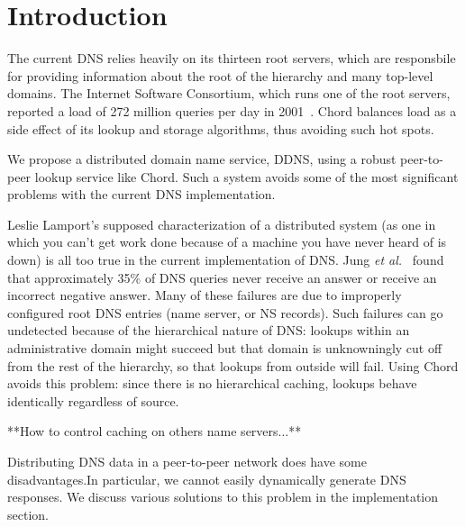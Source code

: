 \section{Introduction}

The current DNS relies heavily on its
thirteen root servers, which are responsbile for providing
information about the root of the hierarchy and many top-level domains.
The Internet Software Consortium, which runs one of the root servers,
reported a load of 272 million queries per day in 2001~\cite{isc-root}.
Chord balances load as a side effect of its lookup and storage 
algorithms, thus avoiding such hot spots.

We propose a distributed domain name service, DDNS,
using a robust peer-to-peer lookup service like Chord.
Such a system avoids some of the most significant
problems with the current DNS implementation.
 
Leslie Lamport's supposed characterization of a
distributed system (as one in which you can't get work
done because of a machine you have never heard of is down)
is all too true in the current implementation of {DNS}.
Jung {\it et al.}~\cite{dnscache:sigcommimw01} found that approximately
35\% of DNS queries never receive an answer or receive
an incorrect negative answer.
Many of these failures are due to improperly configured
root DNS entries (name server, or NS records).
Such failures can go undetected because of the hierarchical
nature of DNS: lookups within an administrative domain might
succeed but that domain is unknowningly cut off from the rest
of the hierarchy, so that lookups from outside will fail.
Using Chord avoids this problem: since there is no hierarchical
caching, lookups behave identically regardless of source.

**How to control caching on others name servers...**

Distributing DNS data in a peer-to-peer network does have some
disadvantages.In particular, we cannot easily dynamically 
generate DNS responses. We discuss various solutions to 
this problem in the implementation section.



